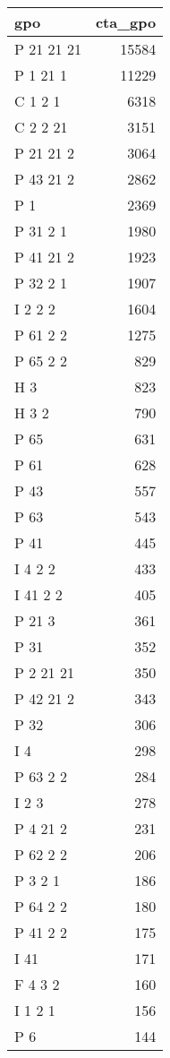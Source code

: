 \documentclass[
]{book}
\theoremstyle{definition}
\theoremstyle{definition}
\theoremstyle{definition}
\theoremstyle{definition}
\theoremstyle{remark}
\begin{document}
\begin{table}
\centering
\begin{tabular}{l|r}
\hline
gpo & cta\_gpo\\
\hline
P 21 21 21 & 15584\\
\hline
P 1 21 1 & 11229\\
\hline
C 1 2 1 & 6318\\
\hline
C 2 2 21 & 3151\\
\hline
P 21 21 2 & 3064\\
\hline
P 43 21 2 & 2862\\
\hline
P 1 & 2369\\
\hline
P 31 2 1 & 1980\\
\hline
P 41 21 2 & 1923\\
\hline
P 32 2 1 & 1907\\
\hline
I 2 2 2 & 1604\\
\hline
P 61 2 2 & 1275\\
\hline
P 65 2 2 & 829\\
\hline
H 3 & 823\\
\hline
H 3 2 & 790\\
\hline
P 65 & 631\\
\hline
P 61 & 628\\
\hline
P 43 & 557\\
\hline
P 63 & 543\\
\hline
P 41 & 445\\
\hline
I 4 2 2 & 433\\
\hline
I 41 2 2 & 405\\
\hline
P 21 3 & 361\\
\hline
P 31 & 352\\
\hline
P 2 21 21 & 350\\
\hline
P 42 21 2 & 343\\
\hline
P 32 & 306\\
\hline
I 4 & 298\\
\hline
P 63 2 2 & 284\\
\hline
I 2 3 & 278\\
\hline
P 4 21 2 & 231\\
\hline
P 62 2 2 & 206\\
\hline
P 3 2 1 & 186\\
\hline
P 64 2 2 & 180\\
\hline
P 41 2 2 & 175\\
\hline
I 41 & 171\\
\hline
F 4 3 2 & 160\\
\hline
I 1 2 1 & 156\\
\hline
P 6 & 144\\

\end{tabular}
\end{table}
\end{document}
